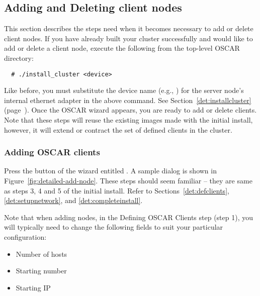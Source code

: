 
\subsection{Adding and Deleting client nodes}

This section describes the steps need when it becomes necessary to add
or delete client nodes. If you have already built your cluster
successfully and would like to add or delete a client node, execute
the following from the top-level OSCAR directory:

\begin{verbatim}
  # ./install_cluster <device>
\end{verbatim}

Like before, you must substitute the device name (e.g., )
for the server node's internal ethernet adapter in the above command.
See Section~\ref{det:installcluster}
(page~\pageref{det:installcluster}). Once the OSCAR wizard appears,
you are ready to add or delete clients. Note that these steps will
reuse the existing images made with the initial install, however, it
will extend or contract the set of defined clients in the cluster.


\subsubsection{Adding OSCAR clients}
\label{det:adding-clients}

Press the button of the wizard entitled . A
sample dialog is shown in Figure~\ref{fig:detailed-add-node}. These
steps should seem familiar -- they are same as steps 3, 4 and 5 of the
initial install.  Refer to Sections~\ref{det:defclients},
\ref{det:setupnetwork}, and \ref{det:completeinstall}.

Note that when adding nodes, in the Defining OSCAR Clients step (step
1), you will typically need to change the following fields to suit
your particular configuration:

\begin{itemize}
\item Number of hosts
\item Starting number
\item Starting IP
\end{itemize}

